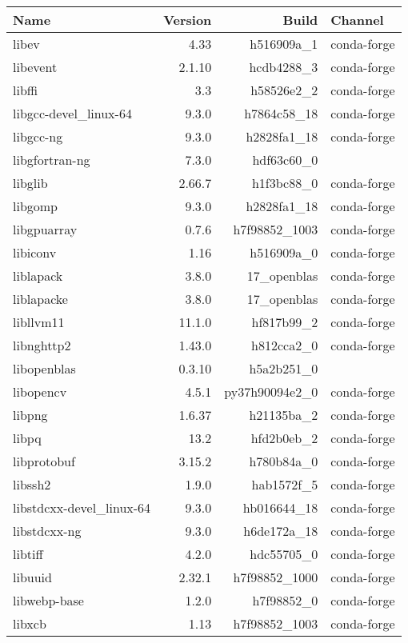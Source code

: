 \begin{table}
	\begin{center}
		\begin{tabular}{|l|r|r|l|}
			\textbf{Name} &\textbf{Version} &\textbf{Build} &\textbf{Channel} \\
			\hline
			libev &4.33 & h516909a\_1 &conda-forge \\
			libevent &2.1.10 & hcdb4288\_3 &conda-forge \\
			libffi &3.3 & h58526e2\_2 &conda-forge \\
			libgcc-devel\_linux-64 &9.3.0 & h7864c58\_18 &conda-forge \\
			libgcc-ng &9.3.0 & h2828fa1\_18 &conda-forge \\
			libgfortran-ng &7.3.0 & hdf63c60\_0 & \\
			libglib &2.66.7 & h1f3bc88\_0 &conda-forge \\
			libgomp &9.3.0 & h2828fa1\_18 &conda-forge \\
			libgpuarray &0.7.6 & h7f98852\_1003 &conda-forge \\
			libiconv &1.16 & h516909a\_0 &conda-forge \\
			liblapack &3.8.0 & 17\_openblas &conda-forge \\
			liblapacke &3.8.0 & 17\_openblas &conda-forge \\
			libllvm11 &11.1.0 & hf817b99\_2 &conda-forge \\
			libnghttp2 &1.43.0 & h812cca2\_0 &conda-forge \\
			libopenblas &0.3.10 & h5a2b251\_0 & \\
			libopencv &4.5.1 & py37h90094e2\_0 &conda-forge \\
			libpng &1.6.37 & h21135ba\_2 &conda-forge \\
			libpq &13.2 & hfd2b0eb\_2 &conda-forge \\
			libprotobuf &3.15.2 & h780b84a\_0 &conda-forge \\
			libssh2 &1.9.0 & hab1572f\_5 &conda-forge \\
			libstdcxx-devel\_linux-64 &9.3.0 & hb016644\_18 &conda-forge \\
			libstdcxx-ng &9.3.0 & h6de172a\_18 &conda-forge \\
			libtiff &4.2.0 & hdc55705\_0 &conda-forge \\
			libuuid &2.32.1 & h7f98852\_1000 &conda-forge \\
			libwebp-base &1.2.0 & h7f98852\_0 &conda-forge \\
			libxcb &1.13 & h7f98852\_1003 &conda-forge \\

\end{tabular}
\end{center}
\end{table}
